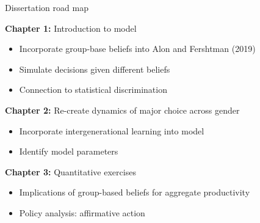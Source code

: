 \documentclass[compress, 8pt]{beamer}
\begin{document}
\begin{frame}{Dissertation road map}

\textbf{Chapter 1:} Introduction to model
\begin{itemize}
    \item Incorporate group-base beliefs into Alon and Fershtman (2019)
    \item Simulate decisions given different beliefs
    \item Connection to statistical discrimination
\end{itemize}


\vspace{4ex}
\textbf{Chapter 2:} Re-create dynamics of major choice across gender
\begin{itemize}
    \item Incorporate intergenerational learning into model
    \item Identify model parameters
\end{itemize}

\vspace{4ex}
\textbf{Chapter 3:} Quantitative exercises
\begin{itemize}
    \item Implications of group-based beliefs for aggregate productivity
    \item Policy analysis: affirmative action
\end{itemize}

\end{frame}
\end{document}
